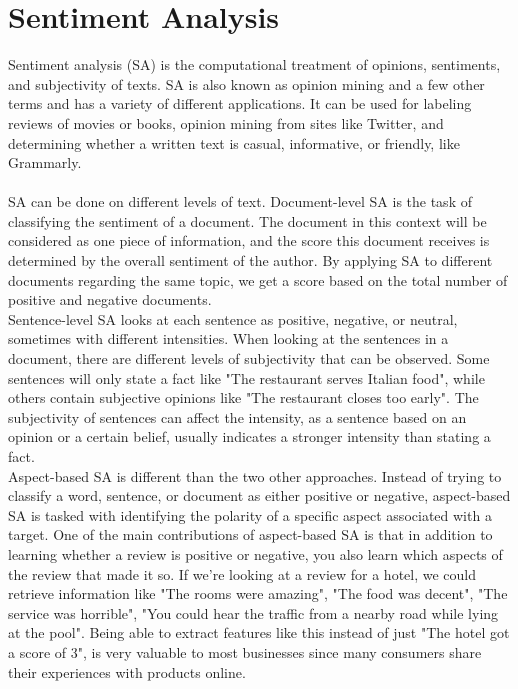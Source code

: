 \documentclass{report}
\begin{document}
\section{Sentiment Analysis}
Sentiment analysis (SA) is the computational treatment of opinions, sentiments, and subjectivity of texts. SA is also known as opinion mining and a few other terms and has a variety of different applications. It can be used for labeling reviews of movies or books, opinion mining from sites like Twitter, and determining whether a written text is casual, informative, or friendly, like Grammarly.\\\\
SA can be done on different levels of text. Document-level SA is the task of classifying the sentiment of a document. The document in this context will be considered as one piece of information, and the score this document receives is determined by the overall sentiment of the author. By applying SA to different documents regarding the same topic, we get a score based on the total number of positive and negative documents.\\
Sentence-level SA looks at each sentence as positive, negative, or neutral, sometimes with different intensities. When looking at the sentences in a document, there are different levels of subjectivity that can be observed. Some sentences will only state a fact like "The restaurant serves Italian food", while others contain subjective opinions like "The restaurant closes too early". The subjectivity of sentences can affect the intensity, as a sentence based on an opinion or a certain belief, usually indicates a stronger intensity than stating a fact.\\
Aspect-based SA is different than the two other approaches. Instead of trying to classify a word, sentence, or document as either positive or negative, aspect-based SA is tasked with identifying the polarity of a specific aspect associated with a target. One of the main contributions of aspect-based SA is that in addition to learning whether a review is positive or negative, you also learn which aspects of the review that made it so. If we're looking at a review for a hotel, we could retrieve information like "The rooms were amazing", "The food was decent", "The service was horrible", "You could hear the traffic from a nearby road while lying at the pool". Being able to extract features like this instead of just "The hotel got a score of 3", is very valuable to most businesses since many consumers share their experiences with products online.\\\\
\end{document}
